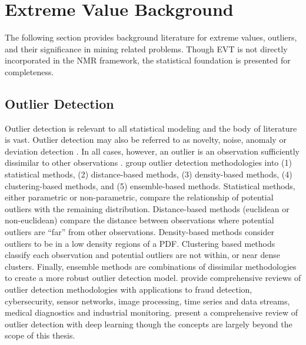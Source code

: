 \FloatBarrier
\section{Extreme Value Background}
\label{sec:01evtreview}

The following section provides background literature for extreme values, outliers, and their significance in mining related problems. Though \gls{EVT} is not directly incorporated in the \gls{NMR} framework, the statistical foundation is presented for completeness.

\FloatBarrier
\subsection{Outlier Detection}
\label{subsec:01outlier}

Outlier detection is relevant to all statistical modeling and the body of literature is vast. Outlier detection may also be referred to as novelty, noise, anomaly or deviation detection \citep{hodge2004survey}. In all cases, however, an outlier is an observation sufficiently dissimilar to other observations \citep{barnett1984outliers}. \cite{wang2019progress} group outlier detection methodologies into (1) statistical methods, (2) distance-based methods, (3) density-based methods, (4) clustering-based methods, and (5) ensemble-based methods. Statistical methods, either parametric or non-parametric, compare the relationship of potential outliers with the remaining distribution. Distance-based methods (euclidean or non-euclidean) compare the distance between observations where potential outliers are ``far'' from other observations. Density-based methods consider outliers to be in a low density regions of a \gls{PDF}. Clustering based methods classify each observation and potential outliers are not within, or near dense clusters. Finally, ensemble methods are combinations of dissimilar methodologies to create a more robust outlier detection model. \cite{hodge2004survey,wang2019progress,pimentel2014review,boukerche2021outlier} provide comprehensive reviews of outlier detection methodologies with applications to fraud detection, cybersecurity, sensor networks, image processing, time series and data streams, medical diagnostics and industrial monitoring. \cite{pang2022deep} present a comprehensive review of outlier detection with deep learning though the concepts are largely beyond the scope of this thesis.


